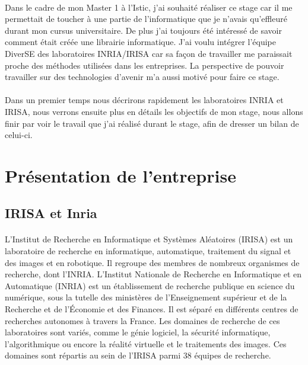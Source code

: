 \documentclass[11pt, a4paper, pdftex]{article}
\begin{document}
        \paragraph{}
            Dans le cadre de mon Master 1 à l'Istic, j'ai souhaité réaliser ce stage car il me permettait de toucher à une partie de l'informatique que je n'avais
            qu'effleuré durant mon cursus universitaire.
            De plus j'ai toujours été intéressé de savoir comment était créée une librairie informatique.
            J'ai voulu intégrer l'équipe DiverSE des laboratoires INRIA/IRISA car sa façon de travailler me paraissait proche des méthodes utilisées dans les entreprises.
            La perspective de pouvoir travailler sur des technologies d'avenir m'a aussi motivé pour faire ce stage.

        \paragraph{}
            Dans un premier temps nous décrirons rapidement les laboratoires INRIA et IRISA, nous verrons ensuite plus en détails les objectifs de mon stage,
            nous allons finir par voir le travail que j'ai réalisé durant le stage, afin de dresser un bilan de celui-ci.
    \newpage
    \section{Présentation de l'entreprise}\label{sec:presentr}
    \vspace{1cm}
    \subsection{IRISA et Inria}\label{subsec:irisa}
        \paragraph{}
            L'Institut de Recherche en Informatique et Systèmes Aléatoires (IRISA) est un laboratoire de recherche en informatique, automatique,
            traitement du signal et des images et en robotique. Il regroupe des membres de nombreux organismes de recherche, dont l'INRIA\@.
            L'Institut Nationale de Recherche en Informatique et en Automatique (INRIA) est un établissement de recherche publique en science du numérique,
            sous la tutelle des ministères de l'Enseignement supérieur et de la Recherche et de l'Économie et des Finances.
            Il est séparé en différents centres de recherches autonomes à travers la France.
            Les domaines de recherche de ces laboratoires sont variés, comme le génie logiciel, la sécurité informatique, l'algorithmique ou encore la réalité virtuelle et le traitements des images.
            Ces domaines sont répartis au sein de l'IRISA parmi 38 équipes de recherche.
    \vspace{1cm}
\end{document}
